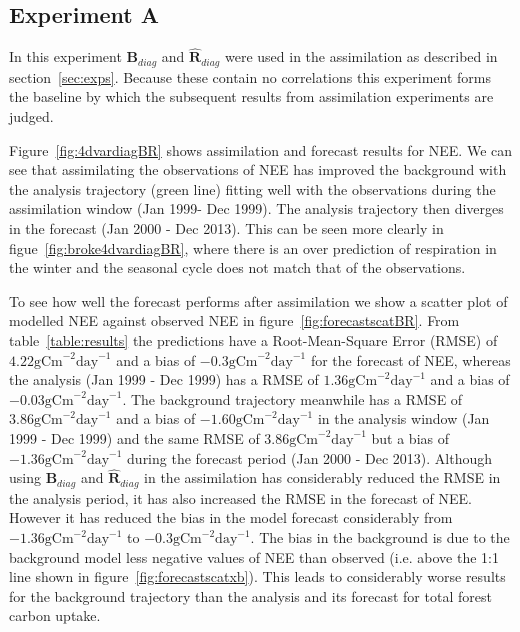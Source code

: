 \documentclass[review]{elsarticle}
\begin{document}
\subsection{Experiment A} \label{sec:expa}
In this experiment $\textbf{B}_{diag}$ and $\hat{\textbf{R}}_{diag}$ were used in the assimilation as described in section~\ref{sec:exps}. Because these contain no correlations this experiment forms the baseline by which the subsequent results from assimilation experiments are judged.  

Figure~\ref{fig:4dvardiagBR} shows assimilation and forecast results for NEE. We can see that assimilating the observations of NEE has improved the background with the analysis trajectory (green line) fitting well with the observations during the assimilation window (Jan 1999- Dec 1999). The analysis trajectory then diverges in the forecast (Jan 2000 - Dec 2013). This can be seen more clearly in figue~\ref{fig:broke4dvardiagBR}, where there is an over prediction of respiration in the winter and the seasonal cycle does not match that of the observations.
 
To see how well the forecast performs after assimilation we show a scatter plot of modelled NEE against observed NEE in figure~\ref{fig:forecastscatBR}. From table~\ref{table:results} the predictions have a Root-Mean-Square Error (RMSE) of $4.22 \text{gCm}^{-2}\text{day}^{-1}$ and a bias of $-0.3 \text{gCm}^{-2}\text{day}^{-1}$ for the forecast of NEE, whereas the analysis (Jan 1999 - Dec 1999) has a RMSE of $1.36 \text{gCm}^{-2}\text{day}^{-1}$ and a bias of $-0.03 \text{gCm}^{-2}\text{day}^{-1}$. The background trajectory meanwhile has a RMSE of $3.86 \text{gCm}^{-2}\text{day}^{-1}$ and a bias of $-1.60 \text{gCm}^{-2}\text{day}^{-1}$ in the analysis window (Jan 1999 - Dec 1999) and the same RMSE of $3.86 \text{gCm}^{-2}\text{day}^{-1}$ but a bias of $-1.36 \text{gCm}^{-2}\text{day}^{-1}$ during the forecast period (Jan 2000 - Dec 2013). Although using $\textbf{B}_{diag}$ and $\hat{\textbf{R}}_{diag}$ in the assimilation has considerably reduced the RMSE in the analysis period, it has also increased the RMSE in the forecast of NEE. However it has reduced the bias in the model forecast considerably from $-1.36 \text{gCm}^{-2}\text{day}^{-1}$ to $-0.3 \text{gCm}^{-2}\text{day}^{-1}$. The bias in the background is due to the background model less negative values of NEE than observed (i.e. above the 1:1 line shown in figure~\ref{fig:forecastscatxb}). This leads to considerably worse results for the background trajectory than the analysis and its forecast for total forest carbon uptake. 
\end{document}
